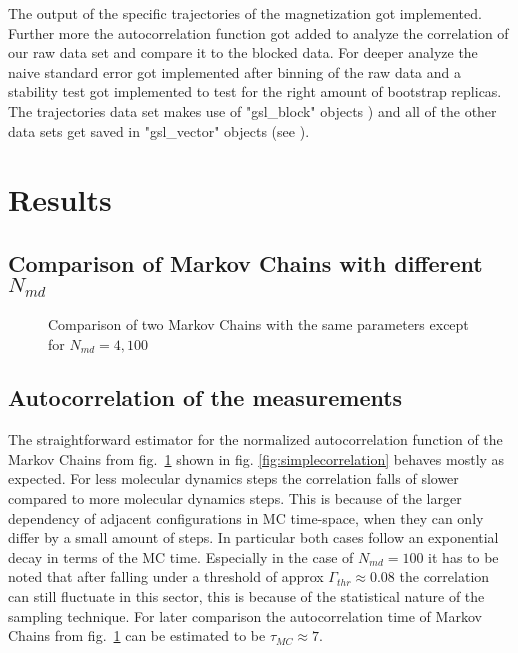 \documentclass{scrartcl}
\begin{document}
The output of the specific trajectories of the magnetization got implemented. Further more the autocorrelation function got added to analyze the  correlation of our raw data set and compare it to the blocked data. For deeper analyze the naive standard error got implemented after binning of the raw data and a stability test got implemented to test for the right amount of bootstrap replicas. The trajectories data set makes use of "gsl\_block" objects \cite{gsldoc_blk}) and all of the other data sets get saved in "gsl\_vector" objects (see \cite{gsldoc_mat}).

\section{Results}

\subsection{Comparison of Markov Chains with different $N_{md}$}

\begin{figure}[htbp]
	
	\caption{Comparison of two Markov Chains with the same parameters except for $N_{md}=4, 100$}
	\label{fig:markovchaincomparison}
\end{figure}



\subsection{Autocorrelation of the measurements}
The straightforward estimator for the normalized autocorrelation function of the Markov Chains from fig.~\ref{fig:markovchaincomparison} shown in fig. \ref{fig:simplecorrelation} behaves mostly as expected. For less molecular dynamics steps the correlation falls of slower compared to more molecular dynamics steps. This is because of the larger dependency of adjacent configurations in MC time-space, when they can only differ by a small amount of steps. In particular both cases follow an exponential decay in terms of the MC time. Especially in the case of $N_{md}=100$ it has to be noted that after falling under a threshold of approx $\Gamma_{thr}\approx0.08$ the correlation can still fluctuate in this sector, this is because of the statistical nature of the sampling technique. For later comparison the autocorrelation time of Markov Chains from fig.~\ref{fig:markovchaincomparison} can be estimated to be $\tau_{MC}\approx 7$. 
\end{document}
